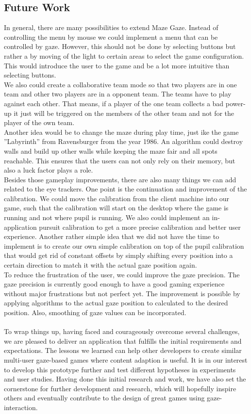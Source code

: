 \documentclass{sigchi}
\begin{document}
\subsection{Future Work}
In general, there are many possibilities to extend Maze Gaze. Instead of controlling the menu by mouse we could implement a menu that can be controlled by gaze. However, this should not be done by selecting buttons but rather a by moving of the light to certain areas to select the game configuration. This would introduce the user to the game and be a lot more intuitive than selecting buttons.\\ 
We also could create a collaborative team mode so that two players are in one team and other two players are in a opponent team. The teams have to play against each other. That means, if a player of the one team collects a bad power-up it just will be triggered on the members of the other team and not for the player of the own team.\\ 
Another idea would be to change the maze during play time, just ike the game ''Labyrinth'' from Ravensburger from the year 1986. An algorithm could destroy walls and build up other walls while keeping the maze fair and all spots reachable. This ensures that the users can not only rely on their memory, but also a luck factor plays a role.\\
Besides those gameplay improvements, there are also many things we can add related to the eye trackers. One point is the continuation and improvement of the calibration. We could move the calibration from the client machine into our game, such that the calibration will start on the desktop where the game is running and not where pupil is running. We also could implement an in-application pursuit calibration to get a more precise calibration and better user experience. Another rather simple idea that we did not have the time to implement is to create our own simple calibration on top of the pupil calibration that would get rid of constant offsets by simply shifting every position into a certain direction to match it with the actual gaze position again. \\ 
To reduce the frustration of the user, we could improve the gaze precision. The gaze precision is currently good enough to have a good gaming experience without major frustrations but not perfect yet. The improvement is possible by applying algorithms to the actual gaze position to calculated to the desired position. Also, smoothing of gaze values can be incorporated. \\
\\
To wrap things up, having faced and courageously overcome several challenges, we are pleased to deliver an application that fulfills the initial requirements and expectations. The lessons we learned can help other developers to create similar multi-user gaze-based games where content adaption is useful. It is in our interest to develop this prototype further and test different hypotheses in experiments and user studies. Having done this initial research and work, we have also set the cornerstone for further development and research, which will hopefully inspire others and eventually contribute to the design of great games using gaze-interaction.

\balance{}




\end{document}
